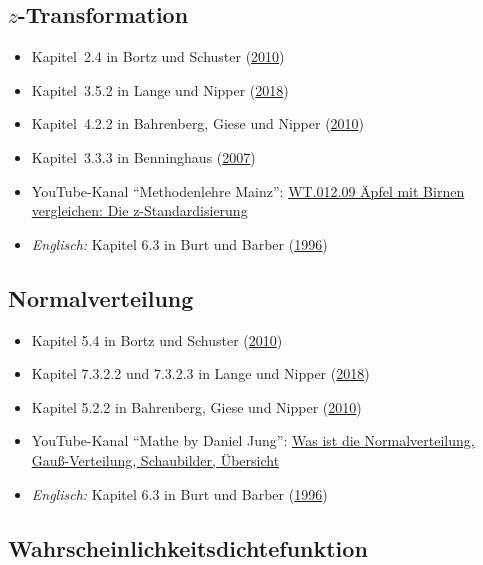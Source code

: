 \documentclass[
  11pt,
  ngerman,
  a4paper,
]{report}
\providecommand{\tightlist}{%
  \setlength{\itemsep}{0pt}\setlength{\parskip}{0pt}}
\begin{document}
\hypertarget{z-transformation-1}{%
\subsection{\texorpdfstring{\(z\)-Transformation}{z-Transformation}}\label{z-transformation-1}}

\begin{itemize}
\tightlist
\item
  Kapitel~2.4 in Bortz und Schuster (\protect\hyperlink{ref-bortz}{2010})
\item
  Kapitel~3.5.2 in Lange und Nipper (\protect\hyperlink{ref-delange}{2018})
\item
  Kapitel~4.2.2 in Bahrenberg, Giese und Nipper (\protect\hyperlink{ref-bahrenberg}{2010})
\item
  Kapitel~3.3.3 in Benninghaus (\protect\hyperlink{ref-benninghaus}{2007})
\item
  YouTube-Kanal \enquote{Methodenlehre Mainz}: \href{https://www.youtube.com/watch?v=AiucvUlIP8k}{WT.012.09 Äpfel mit Birnen vergleichen: Die z-Standardisierung}
\item
  \emph{Englisch:} Kapitel 6.3 in Burt und Barber (\protect\hyperlink{ref-burt}{1996})
\end{itemize}

\hypertarget{normalverteilung-1}{%
\subsection{Normalverteilung}\label{normalverteilung-1}}

\begin{itemize}
\tightlist
\item
  Kapitel 5.4 in Bortz und Schuster (\protect\hyperlink{ref-bortz}{2010})
\item
  Kapitel 7.3.2.2 und 7.3.2.3 in Lange und Nipper (\protect\hyperlink{ref-delange}{2018})
\item
  Kapitel 5.2.2 in Bahrenberg, Giese und Nipper (\protect\hyperlink{ref-bahrenberg}{2010})
\item
  YouTube-Kanal \enquote{Mathe by Daniel Jung}: \href{https://www.youtube.com/watch?v=_f1vgWUiavY}{Was ist die Normalverteilung, Gauß-Verteilung, Schaubilder, Übersicht}
\item
  \emph{Englisch:} Kapitel 6.3 in Burt und Barber (\protect\hyperlink{ref-burt}{1996})
\end{itemize}

\hypertarget{wahrscheinlichkeitsdichtefunktion}{%
\subsection{Wahrscheinlichkeitsdichtefunktion}\label{wahrscheinlichkeitsdichtefunktion}}
\end{document}
